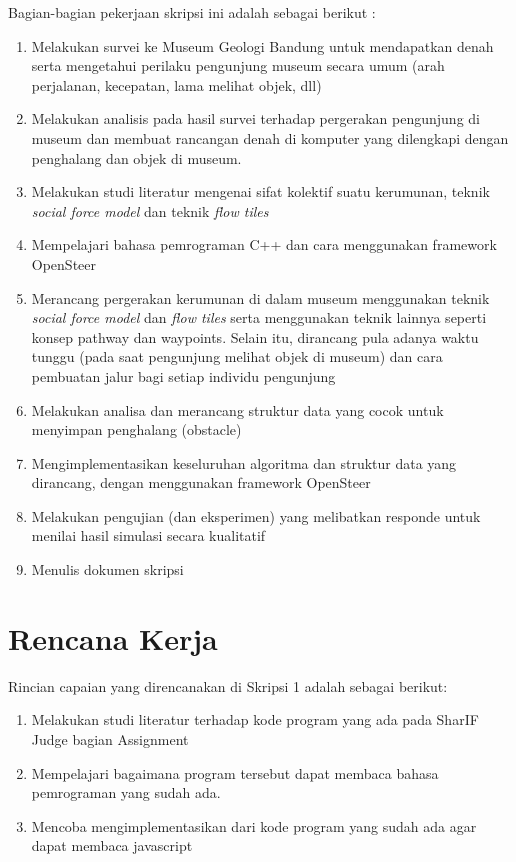 \documentclass[a4paper,twoside]{article}
\begin{document}
Bagian-bagian pekerjaan skripsi ini adalah sebagai berikut :
	\begin{enumerate}
		\item Melakukan survei ke Museum Geologi Bandung untuk mendapatkan denah serta mengetahui perilaku pengunjung museum secara umum (arah perjalanan, kecepatan, lama melihat objek, dll)
		\item Melakukan analisis pada hasil survei terhadap pergerakan pengunjung di museum dan membuat rancangan denah di komputer yang dilengkapi dengan penghalang dan objek di museum.
		\item Melakukan studi literatur mengenai sifat kolektif suatu kerumunan, teknik {\it social force model} dan teknik {\it flow tiles}
		\item Mempelajari bahasa pemrograman C++ dan cara menggunakan framework OpenSteer
		\item Merancang pergerakan kerumunan di dalam museum menggunakan teknik {\it social force model} dan {\it flow tiles} serta menggunakan teknik lainnya seperti konsep pathway dan waypoints. Selain itu, dirancang pula adanya waktu tunggu (pada saat pengunjung melihat objek di museum) dan cara pembuatan jalur bagi setiap individu pengunjung
		\item Melakukan analisa dan merancang struktur data yang cocok untuk menyimpan penghalang (obstacle)
		\item Mengimplementasikan keseluruhan algoritma dan struktur data yang dirancang, dengan menggunakan framework OpenSteer 
		\item Melakukan pengujian (dan eksperimen) yang melibatkan responde untuk menilai hasil simulasi secara kualitatif
		\item Menulis dokumen skripsi
	\end{enumerate}

\section{Rencana Kerja}
Rincian capaian yang direncanakan di Skripsi 1 adalah sebagai berikut:
\begin{enumerate}
\item Melakukan studi literatur terhadap kode program yang ada pada SharIF Judge bagian Assignment
\item Mempelajari bagaimana program tersebut dapat membaca bahasa pemrograman yang sudah ada.
\item Mencoba mengimplementasikan dari kode program yang sudah ada agar dapat membaca javascript 
\end{enumerate}
\end{document}
